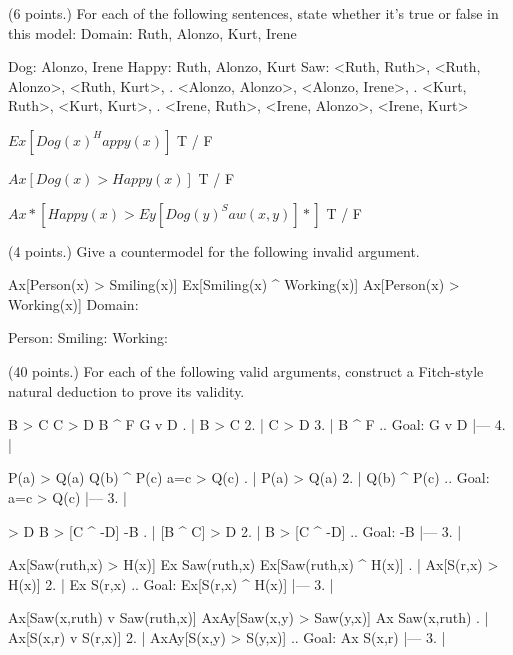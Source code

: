 \endproblems

(6 points.) For each of the following sentences, state whether it's true or false in this model:
\answer
	\firstordermodel 
	Domain: Ruth, Alonzo, Kurt, Irene

	Dog:    Alonzo, Irene
	Happy:  Ruth, Alonzo, Kurt
	Saw:    <Ruth, Ruth>, <Ruth, Alonzo>, <Ruth, Kurt>,
	   .    <Alonzo, Alonzo>, <Alonzo, Irene>,
	   .    <Kurt, Ruth>, <Kurt, Kurt>,
	   .    <Irene, Ruth>, <Irene, Alonzo>, <Irene, Kurt>
	\endfirstordermodel
\endanswer\bigskip

\problems
{}
$ Ex[Dog(x) ^ Happy(x)] $
	\answer
	 T / F
	\endanswer

$ Ax[Dog(x) > Happy(x)] $
	\answer
	 T / F
	\endanswer

$ Ax*[Happy(x) > Ey[Dog(y) ^ Saw(x,y)]*] $
	\answer
	 T / F
	\endanswer
\endproblems

(4 points.) Give a countermodel for the following invalid argument.

\problems
{}
\argument
 Ax[Person(x) > Smiling(x)]
 Ex[Smiling(x) ^ Working(x)]
\argumentline
 Ax[Person(x) > Working(x)]
\endargument
	\answer
	\firstordermodel
	Domain:  

	Person:  
	Smiling: 
	Working: 
	\endfirstordermodel
	\endanswer
\endproblems 

(40 points.) For each of the following valid arguments, construct a Fitch-style natural deduction to prove its validity.

\problems
{}
\argument
 B > C
 C > D
 B ^ F
\argumentline
 G v D
\endargument
{}
	\answer
	. | B > C
	 2. | C > D
	 3. | B ^ F  ..  Goal: G v D
	    |---
	 4. | 
	\endfitchproof
	\endanswer

\argument
 P(a) > Q(a)
 Q(b) ^ P(c)
\argumentline
 a=c > Q(c)
\endargument
{}
	\answer
	. | P(a) > Q(a)
	 2. | Q(b) ^ P(c)  ..  Goal: a=c > Q(c)
	    |---
	 3. | 
	\endfitchproof
	\endanswer

\argument
 [B ^ C] > D
 B > [C ^ -D]
\argumentline
 -B
\endargument
{}
	\answer
	. | [B ^ C] > D
	 2. | B > [C ^ -D]  ..  Goal: -B
	    |---
	 3. | 
	\endfitchproof
	\endanswer

\argument
 Ax[Saw(ruth,x) > H(x)]
 Ex Saw(ruth,x)
\argumentline
 Ex[Saw(ruth,x) ^ H(x)]
\endargument
{}
	\answer
	. | Ax[S(r,x) > H(x)]
	 2. | Ex S(r,x)              ..  Goal: Ex[S(r,x) ^ H(x)]
	    |---
	 3. | 
	\endfitchproof
	\endanswer

\argument
 Ax[Saw(x,ruth) v Saw(ruth,x)]
 AxAy[Saw(x,y) > Saw(y,x)]
\argumentline
 Ax Saw(x,ruth)
\endargument
{}
	\answer
	. | Ax[S(x,r) v S(r,x)]
	 2. | AxAy[S(x,y) > S(y,x)]        ..  Goal: Ax S(x,r)
	    |---
	 3. | 
	\endfitchproof
	\endanswer

\endproblems
\bye
